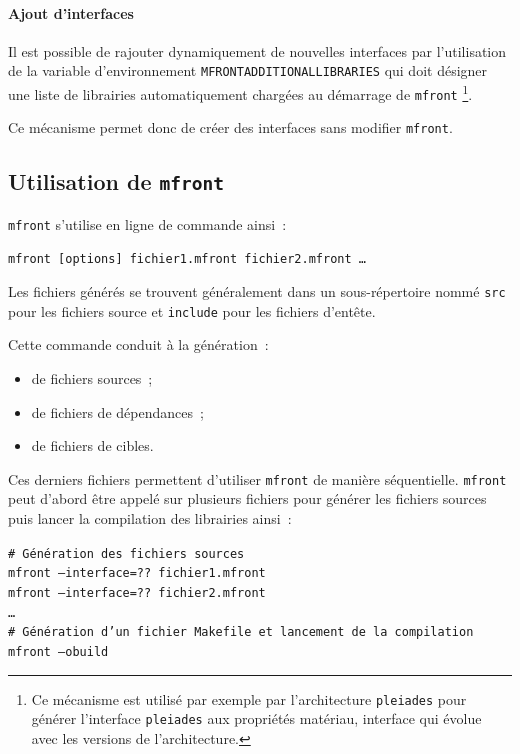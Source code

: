 \documentclass[rectoverso,pleiades,pstricks,leqno,anti]{texmf/note_technique_2010}
\newcommand{\pleiades}{\texttt{pleiades}}
\newcommand{\mfront}{\texttt{mfront}}
\begin{document}
\paragraph{Ajout d'interfaces} Il est possible de rajouter dynamiquement
de nouvelles interfaces par l'utilisation de la variable d'environnement
{\tt MFRONT\textunderscore{}\-ADDITIONAL\textunderscore{}\-LIBRARIES}
qui doit désigner une liste de librairies automatiquement chargées au
démarrage de \mfront{} \footnote{Ce mécanisme est utilisé par exemple
  par l'architecture \pleiades{} pour générer l'interface {\tt pleiades}
  aux propriétés matériau, interface qui évolue avec les versions de
  l'architecture.}.

Ce mécanisme permet donc de créer des interfaces sans modifier
\mfront{}.

\subsection{Utilisation de \mfront{}}
\label{sec:mfront:using}

\mfront{} s'utilise en ligne de commande ainsi~:
\begin{center}
{\tt mfront [options] fichier1.mfront fichier2.mfront \ldots}
\end{center}

Les fichiers générés se trouvent généralement dans un sous-répertoire
nommé {\tt src} pour les fichiers source et {\tt include} pour les
fichiers d'entête.

Cette commande conduit à la génération~:
\begin{itemize}
  \item de fichiers sources~;
  \item de fichiers de dépendances~;
  \item de fichiers de cibles.
\end{itemize}
Ces derniers fichiers permettent d'utiliser \mfront{} de manière
séquentielle. \mfront{} peut d'abord être appelé sur plusieurs fichiers
pour générer les fichiers sources puis lancer la compilation des
librairies ainsi~:
\begin{center}
  \begin{minipage}{0.6\textwidth}
    \textcolor{ceagrisclair}{\tt \# Génération des fichiers sources}\\
    {\tt mfront --interface=?? fichier1.mfront} \\
    {\tt mfront --interface=?? fichier2.mfront} \\
    {\tt \ldots} \\
    \textcolor{ceagrisclair}{\tt \# Génération d'un fichier Makefile et lancement de la compilation}\\
    {\tt mfront --obuild} \\
  \end{minipage}
\end{center}
\end{document}
